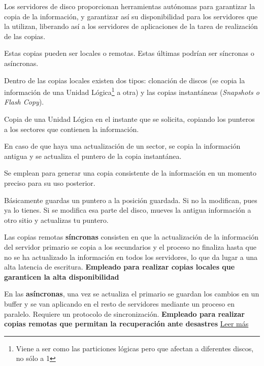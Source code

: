 Los servidores de disco proporcionan herramientas autónomas para garantizar la copia de la información, y garantizar así su disponibilidad para los servidores que la utilizan, liberando así a los servidores de aplicaciones de la tarea de realización de las copias.

Estas copias pueden ser locales o remotas. Estas últimas podrían ser síncronas o asíncronas.

Dentro de las copias locales existen dos tipos: clonación de discos (se copia la información de una Unidad Lógica\footnote{Viene a ser como las particiones lógicas pero que afectan a diferentes discos, no sólo a 1} a otra) y las copias instantáneas (\textit{Snapshots o Flash Copy}).

\begin{defn}
Copia de una Unidad Lógica en el instante que se solicita, copiando los punteros a los sectores que contienen la información.

En caso de que haya una actualización de un sector, se copia la información antigua y se actualiza el puntero de la copia instantánea.

Se emplean para generar una copia consistente de la información en un momento preciso para su uso posterior.

\obs Básicamente guardas un puntero a la posición guardada. Si no la modifican, pues ya lo tienes. Si se modifica esa parte del disco, mueves la antigua información a otro sitio y actualizas tu puntero.
\end{defn}

Las copias remotas \textbf{síncronas} consisten en que la actualización de la información del servidor primario se copia a los secundarios y el proceso no finaliza hasta que no se ha actualizado la información en todos los servidores, lo que da lugar a una alta latencia de escritura. \textbf{Empleado para realizar copias locales que garanticen la alta disponibilidad}

En las \textbf{asíncronas}, una vez se actualiza el primario se guardan los cambios en un buffer y se van aplicando en el resto de servidores mediante un proceso en paralelo. Requiere un protocolo de sincronización. \textbf{Empleado para realizar copias remotas que permitan la recuperación ante desastres} \href{http://searchdatacenter.techtarget.com/es/consejo/Ventajas-e-inconvenientes-de-la-replicacion-remota-en-la-recuperacion-de-desastres}{Leer más}

